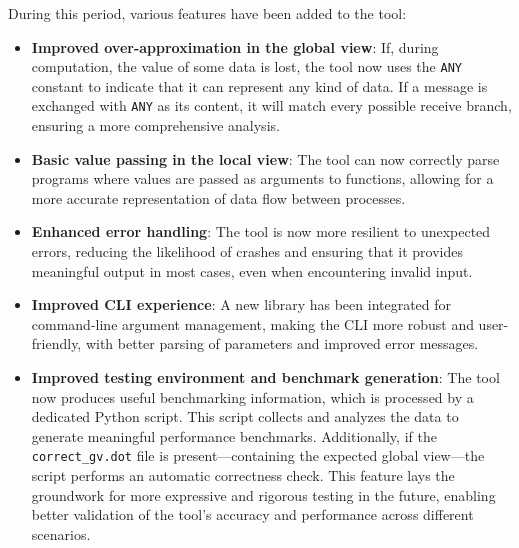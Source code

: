 
During this period, various features have been added to the tool:
\begin{itemize}  
    \item \textbf{Improved over-approximation in the global view}:  
    If, during computation, the value of some data is lost, the tool now  
    uses the \texttt{ANY} constant to indicate that it can represent any kind  
    of data. If a message is exchanged with \texttt{ANY} as its content, it  
    will match every possible receive branch, ensuring a more comprehensive  
    analysis.  
    
    \item \textbf{Basic value passing in the local view}:  
    The tool can now correctly parse programs where values are passed as  
    arguments to functions, allowing for a more accurate representation of  
    data flow between processes.  
    
    \item \textbf{Enhanced error handling}:  
    The tool is now more resilient to unexpected errors, reducing the  
    likelihood of crashes and ensuring that it provides meaningful output in  
    most cases, even when encountering invalid input.  
    
    \item \textbf{Improved CLI experience}:  
    A new library has been integrated for command-line argument management,  
    making the CLI more robust and user-friendly, with better parsing of  
    parameters and improved error messages.  

    \item \textbf{Improved testing environment and benchmark generation}:  
    The tool now produces useful benchmarking information, which is processed  
    by a dedicated Python script. This script collects and analyzes the data  
    to generate meaningful performance benchmarks. Additionally, if the  
    \texttt{correct\_gv.dot} file is present—containing the expected global  
    view—the script performs an automatic correctness check. This feature  
    lays the groundwork for more expressive and rigorous testing in the future,  
    enabling better validation of the tool's accuracy and performance across  
    different scenarios.  

\end{itemize}

